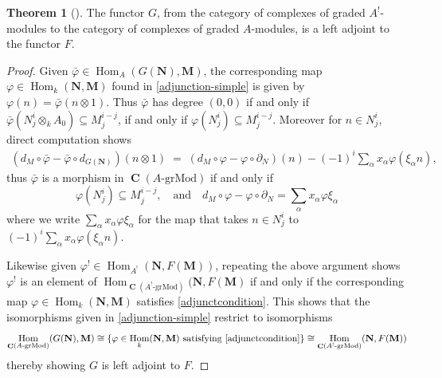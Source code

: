\documentclass[a4paper]{article}
\theoremstyle{definition}
\newtheorem{theorem}[defn]{Theorem}
\theoremstyle{remark}
\newcommand{\grMod}{\ensuremath{\text{-grMod}}}
\DeclareMathOperator{\Hom}{\text{Hom}}
\DeclareMathOperator{\Ch}{\mathbf{C}}
\begin{document}
\begin{theorem}[] \label{adjunction}
    The functor \(G\), from the category of complexes of graded \(A^!\)-modules
    to the category of complexes of graded \(A\)-modules, is a left adjoint to
    the functor \(F\).
    \begin{proof}
        Given \(\bar{\varphi}\in \Hom_{A}(G(\mathbf{N}),
        \mathbf{M})\), the corresponding map \(\varphi\in
        \Hom_k(\mathbf{N},\mathbf{M})\) found in \cref{adjunction-simple} is
        given by \(\varphi(n)=\bar\varphi(n\otimes 1)\). Thus \(\bar\varphi\)
        has degree \((0,0)\) if and only if \(\bar\varphi(N^i_j \otimes_k A_0)
        \subseteq M^{i-j}_j\), if and only if \(\varphi(N^i_j)\subseteq
        M^{i-j}_j\).  Moreover for \(n\in N^i_j\), direct computation shows
        \begin{align*}
            (d_M \circ \bar\varphi - \bar\varphi \circ d_{G(\mathbf{N})}) (n
            \otimes 1) \; = \; (d_M \circ \varphi - \varphi \circ
            \partial_N) (n) - (-1)^i \sum_\alpha x_\alpha \varphi(\xi_\alpha n),
        \end{align*}
        thus \(\bar\varphi\) is a morphism in \(\Ch(A\grMod)\) if and only if
        \begin{equation}\label{adjunctcondition}
            \varphi(N^i_j)\subseteq M^{i-j}_j, \quad \text{and} \quad d_M\circ
            \varphi - \varphi \circ \partial_N = \sum_\alpha x_\alpha \varphi
            \xi_\alpha        
        \end{equation}
        where we write \(\sum_\alpha x_\alpha\varphi \xi_\alpha\) for the map
        that takes \(n\in N^i_j\) to \((-1)^i\sum_\alpha x_\alpha
        \varphi(\xi_\alpha n)\).

        Likewise given \(\varphi^!\in \Hom_{A^!}(\mathbf{N},F(\mathbf{M}))\),
        repeating the above argument shows \(\varphi^!\) is an element of
        \(\Hom_{\Ch(A^!\grMod)}(\mathbf{N},F(\mathbf{M})\) if and only if
        the corresponding map \(\varphi \in \Hom_k(\mathbf{N},\mathbf{M})\)
        satisfies \eqref{adjunctcondition}. This shows that the isomorphisms
        given in \cref{adjunction-simple} restrict to isomorphisms
        \[\Hom_{\Ch(A\grMod)}(G(\mathbf{N}),\mathbf{M})\cong \{\varphi\in \Hom_k(\mathbf{N},\mathbf{M}) \text{ satisfying \eqref{adjunctcondition}}\} \cong \Hom_{\Ch(A^!\grMod)}(\mathbf{N},F(\mathbf{M})) \]
        thereby showing \(G\) is left adjoint to \(F\).
    \end{proof}
\end{theorem}
\end{document}
